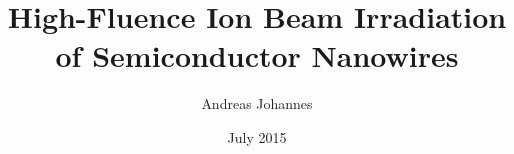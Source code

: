 \titlehead{Friedrich Schiller Universität Jena\\
PAF}
\subject{Dissertation}
\title{High-Fluence Ion Beam Irradiation of Semiconductor Nanowires}
\author{Andreas Johannes}
\date{July 2015}
\maketitle




